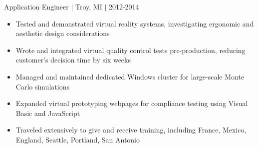 \documentclass[11pt]{article}
\begin{document}
\hfill { Application Engineer $|$ Troy, MI $|$ 2012-2014}

\begin{itemize}
\item Tested and demonstrated virtual reality systems, investigating ergonomic and aesthetic design considerations 
\item Wrote and integrated virtual quality control tests pre-production, reducing customer's decision time by six weeks
\item Managed and maintained dedicated Windows cluster for large-scale Monte Carlo simulations
\item Expanded virtual prototyping webpages for compliance testing using Visual Basic and JavaScript
\item Traveled extensively to give and receive training, including France, Mexico, England, Seattle, Portland, San Antonio 
\end{itemize}
\end{document}
